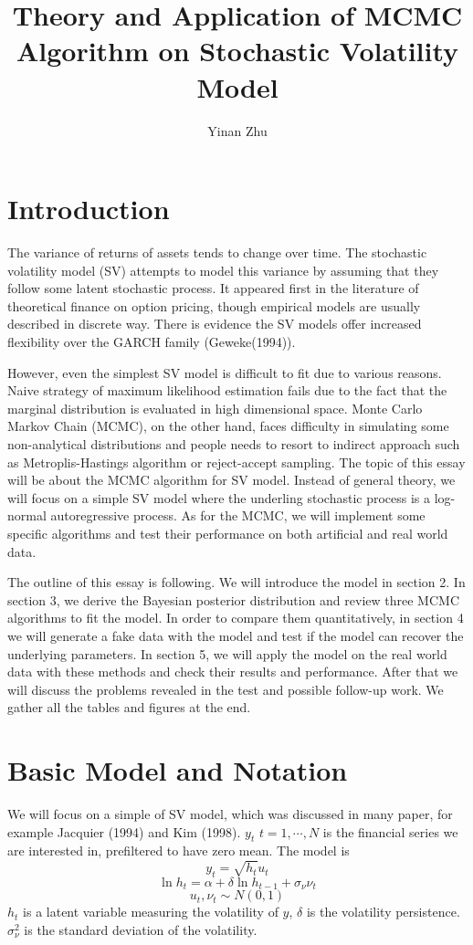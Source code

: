 \documentclass{article}
\title{Theory and Application of MCMC Algorithm on Stochastic Volatility Model}
\author{Yinan Zhu}
\date{}
\begin{document}
\maketitle
\section{Introduction}
The variance of returns of assets tends to change over time. The stochastic volatility model (SV) attempts to model this variance by assuming that they follow some latent stochastic process. It appeared first in the literature of theoretical finance on option pricing, though empirical models are usually described in discrete way. There is evidence the SV models offer increased flexibility over the GARCH family (Geweke(1994)).

However, even the simplest SV model is difficult to fit due to various reasons. Naive strategy of maximum likelihood estimation fails due to the fact that the marginal distribution is evaluated in high dimensional space. Monte Carlo Markov Chain (MCMC), on the other hand, faces difficulty in simulating some non-analytical distributions and people needs to resort to indirect approach such as Metroplis-Hastings algorithm or reject-accept sampling. The topic of this essay will be about the MCMC algorithm for SV model. Instead of general theory, we will focus on a simple SV model where the underling stochastic process is a log-normal autoregressive process. As for the MCMC, we will implement some specific algorithms and test their performance on both artificial and real world data.

The outline of this essay is following. We will introduce the model in section 2.  In section 3, we derive the Bayesian posterior distribution and review three MCMC algorithms to fit the model. In order to compare them quantitatively, in section 4 we will generate a fake data with the model and test if the model can recover the underlying parameters. In section 5, we will apply the model on the real world data with these methods and check their results and performance. After that we will discuss the problems revealed in the test and possible follow-up work. We gather all the tables and figures at the end.
\section{Basic Model and Notation}
We will focus on a simple of SV model, which was discussed in many paper, for example Jacquier (1994) and Kim (1998). $y_t$ $t=1,\cdots, N$ is the financial series we are interested in, prefiltered to have zero mean. The model is
\[
y_t=\sqrt{h_t}u_t
\]
\[
\ln h_t=\alpha+\delta\ln h_{t-1}+\sigma_\nu\nu_t
\]
\[
u_t,\nu_t\sim N(0,1)
\]
$h_t$ is a latent variable measuring the volatility of $y$, $\delta$ is the volatility persistence. $\sigma_\nu^2$ is the standard deviation of the volatility.
\end{document}
